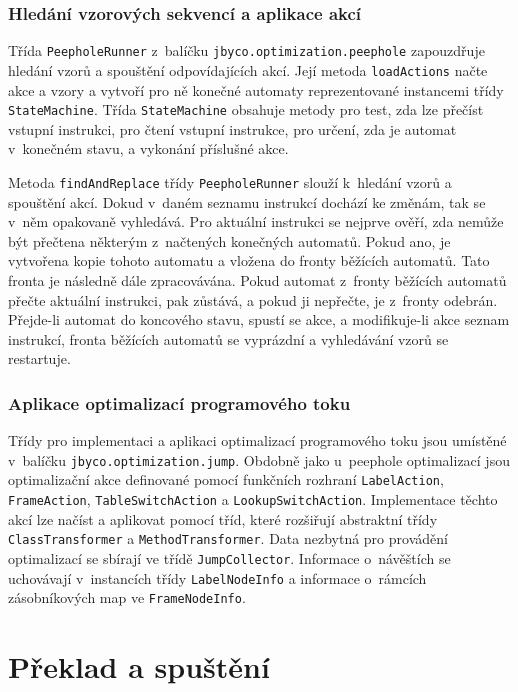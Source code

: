 \subsubsection{Hledání vzorových sekvencí a aplikace akcí}

Třída \texttt{PeepholeRunner} z~balíčku \texttt{jbyco.optimization.peephole} zapouzdřuje hledání vzorů a spouštění odpovídajících akcí. Její metoda \texttt{loadActions} načte akce a vzory a vytvoří pro ně konečné automaty reprezentované instancemi třídy \texttt{StateMachine}. Třída \texttt{StateMachine} obsahuje metody pro test, zda lze přečíst vstupní instrukci, pro čtení vstupní instrukce, pro určení, zda je automat v~konečném stavu, a vykonání příslušné akce. 

Metoda \texttt{findAndReplace} třídy \texttt{PeepholeRunner} slouží k~hledání vzorů a spouštění akcí. Dokud v~daném seznamu instrukcí dochází ke změnám, tak se v~něm opakovaně vyhledává. Pro aktuální instrukci se nejprve ověří, zda nemůže být přečtena některým z~načtených konečných automatů. Pokud ano, je vytvořena kopie tohoto automatu a vložena do fronty běžících automatů. Tato fronta je následně dále zpracovávána. Pokud automat z~fronty běžících automatů přečte aktuální instrukci, pak zůstává, a pokud ji nepřečte, je z~fronty odebrán. Přejde-li automat do koncového stavu, spustí se akce, a modifikuje-li akce seznam instrukcí, fronta běžících automatů se vyprázdní a vyhledávání vzorů se restartuje.

\subsubsection{Aplikace optimalizací programového toku}

Třídy pro implementaci a aplikaci optimalizací programového toku jsou umístěné v~balíčku \texttt{jbyco.optimization.jump}. Obdobně jako u~peephole optimalizací jsou optimalizační akce definované pomocí funkčních rozhraní \texttt{LabelAction}, \texttt{FrameAction}, \texttt{TableSwitchAction} a \texttt{LookupSwitchAction}. Implementace těchto akcí lze načíst a aplikovat pomocí tříd, které rozšiřují abstraktní třídy \texttt{ClassTransformer} a \texttt{MethodTransformer}. Data nezbytná pro provádění optimalizací se sbírají ve třídě \texttt{JumpCollector}. Informace o~návěštích se uchovávají v~instancích třídy \texttt{LabelNodeInfo} a informace o~rámcích zásobníkových map ve \texttt{FrameNodeInfo}.

\section{Překlad a spuštění}

